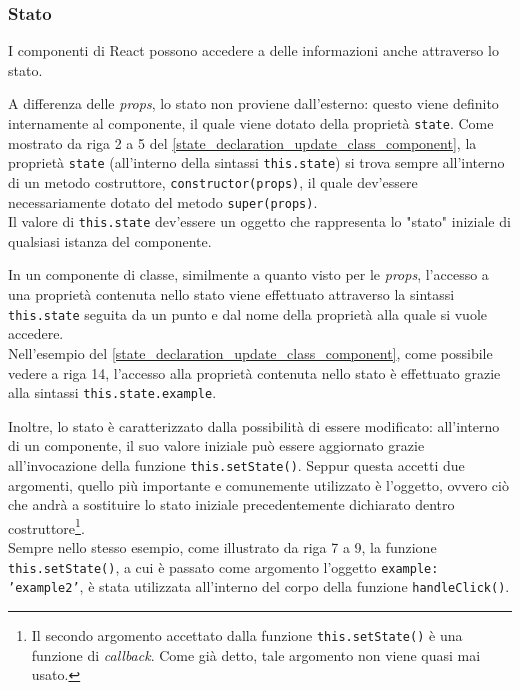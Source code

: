 \subsubsection{Stato}
I componenti di React possono accedere a delle informazioni anche attraverso lo stato. 

A differenza delle \textit{props}, lo stato non proviene dall'esterno: questo viene definito internamente al componente, il quale viene dotato della proprietà \texttt{state}. Come mostrato da riga 2 a 5 del \autoref{state_declaration_update_class_component}, la proprietà \texttt{state} (all'interno della sintassi \texttt{this.state}) si trova sempre all'interno di un metodo costruttore, \texttt{constructor(props)}, il quale dev'essere necessariamente dotato del metodo \texttt{super(props)}.\\
Il valore di \texttt{this.state} dev'essere un oggetto che rappresenta lo "stato" iniziale di qualsiasi istanza del componente.

In un componente di classe, similmente a quanto visto per le \textit{props}, l'accesso a una proprietà contenuta nello stato viene effettuato attraverso la sintassi \texttt{this.state} seguita da un punto e dal nome della proprietà alla quale si vuole accedere.\\
Nell'esempio del \autoref{state_declaration_update_class_component}, come possibile vedere a riga 14, l'accesso alla proprietà contenuta nello stato è effettuato grazie alla sintassi \texttt{this.state.example}.

Inoltre, lo stato è caratterizzato dalla possibilità di essere modificato: all'interno di un componente, il suo valore iniziale può essere aggiornato grazie all'invocazione della funzione \texttt{this.setState()}. Seppur questa accetti due argomenti, quello più importante e comunemente utilizzato è l'oggetto, ovvero ciò che andrà a sostituire lo stato iniziale precedentemente dichiarato dentro costruttore\footnote{Il secondo argomento accettato dalla funzione \texttt{this.setState()} è una funzione di \textit{callback}. Come già detto, tale argomento non viene quasi mai usato.}.\\
Sempre nello stesso esempio, come illustrato da riga 7 a 9, la funzione \texttt{this.setState()}, a cui è passato come argomento l'oggetto \texttt{{example: 'example2'}}, è stata utilizzata all'interno del corpo della funzione \texttt{handleClick()}.



